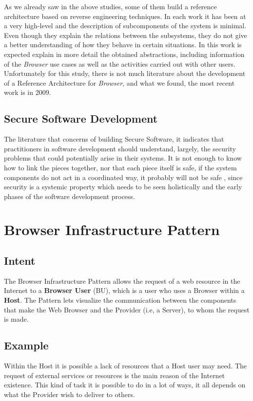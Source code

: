 \documentclass{sig-alternate-05-2015}
\begin{document}
  As we already saw in the above studies, some of them build a reference architecture based on reverse engineering techniques. In each work it has been at a very high-level and the description of subcomponents of the system is minimal. Even though they explain the relations between the subsystems, they do not give a better understanding of how they behave in certain situations. In this work is expected explain in more detail the obtained abstractions, including information of the \textit{Browser} use cases as well as the activities carried out with other users. Unfortunately for this study, there is not much literature about the development of a Reference Architecture for \textit{Browser}, and what we found, the most recent work is \cite{Lwin2009} in 2009.

  \subsection*{Secure Software Development}
  The literature that concerns of building Secure Software, it indicates that practitioners in software development should understand, largely, the security problems that could potentially arise in their systems. It is not enough to know how to link the pieces together, nor that each piece itself is safe, if the system components do not act in a coordinated way, it probably will not be safe \cite{fernandez2013security}, since security is a systemic property which needs to be seen holistically and the early phases of the software development process.


\section*{Browser Infrastructure Pattern}

  \subsection*{Intent}
  The Browser Infrastructure Pattern allows the request of a web resource in the Internet to a \textbf{Browser User} (BU), which is a user who uses a Browser within a \textbf{Host}. The Pattern lets visualize the communication between the components that make the Web Browser and the Provider (i.e, a Server), to whom the request is made.

  \subsection*{Example}
  Within the Host it is possible a lack of resources that a Host user may need. The request of external services or resources is the main reason of the Internet existence. This kind of task it is possible to do in a lot of ways, it all depends on what the Provider wish to deliver to others.
  
\end{document}
